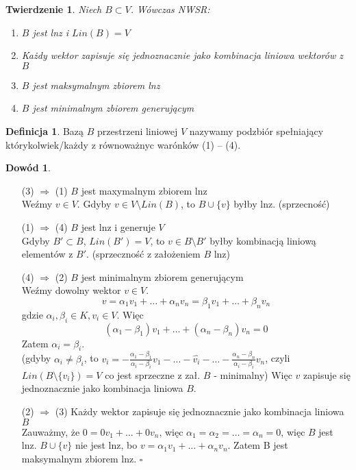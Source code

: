 \documentclass[12pt,a4paper]{article}
\renewcommand{\qed}{$\square$}
\theoremstyle{plain}
\newtheorem{tw}{Twierdzenie}[section]
\theoremstyle{definition}
\theoremstyle{definition}
\newtheorem{df}{Definicja}[section]
\theoremstyle{definition}
\theoremstyle{definition}
\newtheorem*{dd}{Dowód}
\theoremstyle{definition}
\theoremstyle{definition}
\theoremstyle{definition}
\theoremstyle{definition}
\begin{document}
\begin{tw}
  Niech $ B \subset V $. Wówczas NWSR:
  \begin{enumerate}[{(}1{)}]
    \item $ B $ jest lnz i $ Lin(B) = V $
    \item Każdy wektor zapisuje się jednoznacznie jako kombinacja liniowa wektorów z $ B $
    \item $ B $ jest maksymalnym zbiorem lnz
    \item $ B $ jest minimalnym zbiorem generującym
  \end{enumerate}
\end{tw}

\begin{df}
    Bazą $ B $  przestrzeni liniowej $ V $ nazywamy podzbiór spełniający którykolwiek/każdy z równoważnyc warónków (1) -- (4).
\end{df}

\begin{dd} \hfill
    \begin{itemize}
        \item[ (3) $\Rightarrow$ (1) ] $ B $ jest maxymalnym zbiorem lnz\\
            Weźmy $ v \in V $. Gdyby $ v \in V \setminus Lin(B)$, to $ B \cup \{v\}$ byłby lnz. (sprzecność)
        \item[(1) $\Rightarrow$ (4)] $ B $ jest lnz i generuje $ V $\\
            Gdyby $ B' \subset B$, $ Lin(B') = V $, to $ v \in B \setminus B'$ byłby kombinacją liniową elementów z $ B'$. (sprzeczność z założeniem $B$ lnz)
        \item[(4) $\Rightarrow$ (2)] $ B $ jest minimalnym zbiorem generującym\\
            Weźmy dowolny wektor $ v \in V $. 
            $$ v = \alpha_1v_1 + \dots + \alpha_nv_n = \beta_1v_1 + \dots + \beta_nv_n$$ 
            gdzie $ \alpha_i, \beta_i \in K, v_i \in V$. Więc
            $$ (\alpha_1 - \beta_1)v_1 + \dots + (\alpha_n - \beta_n)v_n = 0 $$
            Zatem $ \alpha_i = \beta_i $. \\
            (gdyby $ \alpha_i \neq \beta_i $, to $ v_i = -\frac{\alpha_1 - \beta_1}{\alpha_i - \beta_i}v_1 - \dots - \hat{v_i} - \dots -\frac{\alpha_n - \beta_n}{\alpha_i - \beta_i}v_n $,
            czyli $ Lin(B \setminus \{v_i\}) = V $ co jest sprzeczne z zał. $ B $ - minimalny)
            Więc $ v $ zapisuje się jednoznacznie jako kombinacja liniowa $ B $.
        \item[(2) $\Rightarrow$ (3)] Każdy wektor zapisuje się jednoznacznie jako kombinacja liniowa $ B $\\
            Zauważmy, że $ 0 = 0 v_1 + \dots + 0 v_n $, więc $ \alpha_1 = \alpha_2 = \dots = \alpha_n = 0 $, więc $ B $ jest lnz.
            $ B \cup \{v\} $ nie jest lnz, bo $ v = \alpha_1v_1 + \dots + \alpha_nv_n$. Zatem B jest maksymalnym zbiorem lnz. \qed

    \end{itemize}
\end{dd}
\end{document}
